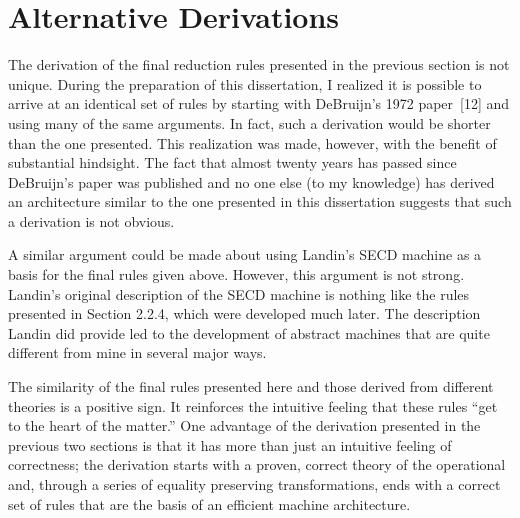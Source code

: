 \section{Alternative Derivations}

The derivation of the final reduction rules presented in the previous section
is not unique. During the preparation of this dissertation, I realized it is
possible to arrive at an identical set of rules by starting with DeBruijn's 1972
paper~[12] and using many of the same arguments. In fact, such a derivation
would be shorter than the one presented. This realization was made, however,
with the benefit of substantial hindsight. The fact that almost twenty years has
passed since DeBruijn's paper was published and no one else (to my knowledge)
has derived an architecture similar to the one presented in this dissertation
suggests that such a derivation is not obvious.

A similar argument could be made about using Landin's SECD machine as a basis
for the final rules given above. However, this argument is not strong. Landin's
original description of the SECD machine is nothing like the rules presented in
Section 2.2.4, which were developed much later. The description Landin did
provide led to the development of abstract machines that are quite different
from mine in several major ways.

The similarity of the final rules presented here and those derived from
different theories is a positive sign. It reinforces the intuitive feeling that
these rules ``get to the heart of the matter.'' One advantage of the derivation
presented in the previous two sections is that it has more than just an
intuitive feeling of correctness; the derivation starts with a proven, correct
theory of the operational \lambdacalculus{} and, through a series of equality
preserving transformations, ends with a correct set of rules that are the basis
of an efficient machine architecture.
